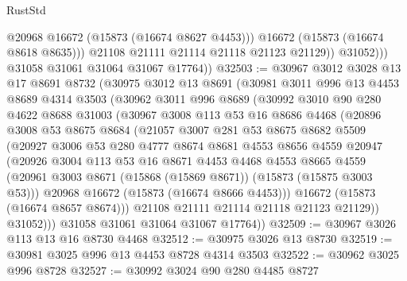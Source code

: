 \begin{lexlean}{RustStd}
\begin{coremodule}
                      @20968
                      @16672
                      (@15873 (@16674 @8627 @4453)))
                    @16672
                    (@15873 (@16674 @8618 @8635)))
                  @21108
                  @21111
                  @21114
                  @21118
                  @21123
                  @21129))
              @31052)))
        @31058
        @31061
        @31064
        @31067
        @17764))
@32503 := @30967
    @3012
    @3028
    @13
    @17
    @8691
    @8732
    (@30975
      @3012
      @13
      @8691
      (@30981
        @3011
        @996
        @13
        @4453
        @8689
        @4314
        @3503
        (@30962
          @3011
          @996
          @8689
          (@30992
            @3010
            @90
            @280
            @4622
            @8688
            @31003
            (@30967
              @3008
              @113
              @53
              @16
              @8686
              @4468
              (@20896
                @3008
                @53
                @8675
                @8684
                (@21057
                  @3007
                  @281
                  @53
                  @8675
                  @8682
                  @5509
                  (@20927
                    @3006
                    @53
                    @280
                    @4777
                    @8674
                    @8681
                    @4553
                    @8656
                    @4559
                    @20947
                    (@20926
                      @3004
                      @113
                      @53
                      @16
                      @8671
                      @4453
                      @4468
                      @4553
                      @8665
                      @4559
                      (@20961 @3003 @8671 (@15868 (@15869 @8671)) (@15873 (@15875 @3003 @53)))
                      @20968
                      @16672
                      (@15873 (@16674 @8666 @4453)))
                    @16672
                    (@15873 (@16674 @8657 @8674)))
                  @21108
                  @21111
                  @21114
                  @21118
                  @21123
                  @21129))
              @31052)))
        @31058
        @31061
        @31064
        @31067
        @17764))
@32509 := @30967 @3026 @113 @13 @16 @8730 @4468
@32512 := @30975 @3026 @13 @8730
@32519 := @30981 @3025 @996 @13 @4453 @8728 @4314 @3503
@32522 := @30962 @3025 @996 @8728
@32527 := @30992 @3024 @90 @280 @4485 @8727

\end{coremodule}
\end{lexlean}
